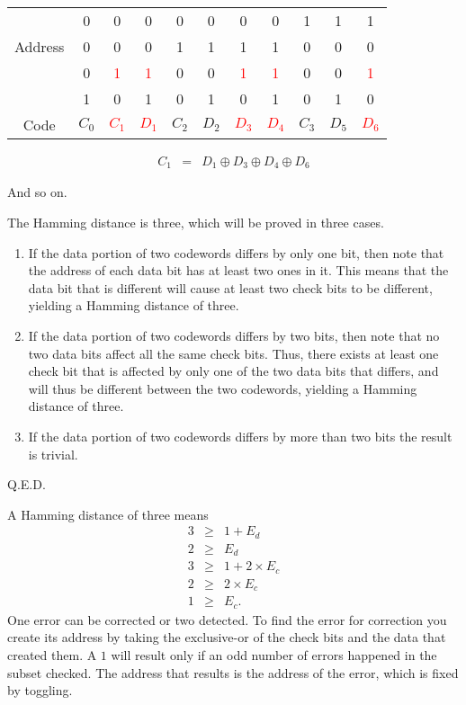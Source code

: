 \vspace{.1in}
\begin{tabular}{|c|c|c|c|c|c|c|c|c|c|c|}
\hline
& 0 & 0 & 0 & 0 & 0 & 0 & 0 & 1 & 1 & 1 \\
Address & 0 & 0 & 0 & 1 & 1 & 1 & 1 & 0 & 0 & 0 \\
& 0 & \textcolor{red}{1} & \textcolor{red}{1} & 0 & 0 & \textcolor{red}{1} & \textcolor{red}{1} & 0 & 0 & \textcolor{red}{1} \\
& 1 & 0 & 1 & 0 & 1 & 0 & 1 & 0 & 1 & 0 \\ \hline
Code& $C_0$ & \textcolor{red}{$C_1$} & \textcolor{red}{$D_1$} & $C_2$ & $D_2$ & \textcolor{red}{$D_3$} & \textcolor{red}{$D_4$} & $C_3$ & $D_5$ & \textcolor{red}{$D_6$} \\ \hline
\end{tabular}
\begin{eqnarray*}
  C_1 &=& D_1 \oplus D_3 \oplus D_4 \oplus D_6
\end{eqnarray*}

And so on.

The Hamming distance is three, which will be proved in three cases.
\begin{enumerate}
    \item If the data portion of two codewords differs by only one bit, then note that the address of each data bit has at least two ones in it.  This means that the data bit that is different will cause at least two check bits to be different, yielding a Hamming distance of three.
    \item If the data portion of two codewords differs by two bits, then note that no two data bits affect all the same check bits. Thus, there exists at least one check bit that is affected by only one of the two data bits that differs, and will thus be different between the two codewords, yielding a Hamming distance of three.
    \item If the data portion of two codewords differs by more than two bits the result is trivial.
\end{enumerate}

\begin{flushright}
Q.E.D.\end{flushright}


  A Hamming distance of three means
\begin{eqnarray*}
  3 &\geq& 1+E_d \\
  2 &\geq& E_d \\
  3 &\geq& 1+2\times E_c \\
  2 &\geq& 2\times E_c \\
  1 &\geq& E_c.
\end{eqnarray*}
One error can be corrected or two detected.  To find the error for correction you create its address by taking the exclusive-or of the check bits and the data that created them.  A $1$ will result only if an odd number of errors happened in the subset checked.  The address that results is the address of the error, which is fixed by toggling.

